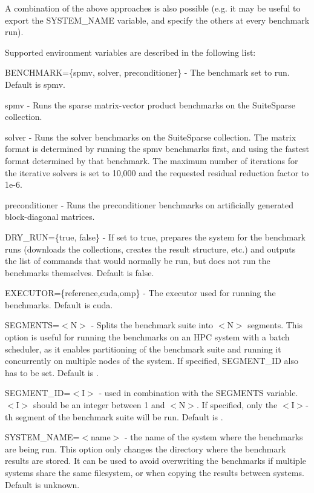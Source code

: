 A combination of the above approaches is also possible (e.\+g. it may be useful to {\ttfamily export} the {\ttfamily S\+Y\+S\+T\+E\+M\+\_\+\+N\+A\+ME} variable, and specify the others at every benchmark run).

Supported environment variables are described in the following list\+:


\begin{DoxyItemize}
\item {\ttfamily B\+E\+N\+C\+H\+M\+A\+RK=\{spmv, solver, preconditioner\}} -\/ The benchmark set to run. Default is {\ttfamily spmv}.
\begin{DoxyItemize}
\item {\ttfamily spmv} -\/ Runs the sparse matrix-\/vector product benchmarks on the Suite\+Sparse collection.
\item {\ttfamily solver} -\/ Runs the solver benchmarks on the Suite\+Sparse collection. The matrix format is determined by running the {\ttfamily spmv} benchmarks first, and using the fastest format determined by that benchmark. The maximum number of iterations for the iterative solvers is set to 10,000 and the requested residual reduction factor to 1e-\/6.
\item {\ttfamily preconditioner} -\/ Runs the preconditioner benchmarks on artificially generated block-\/diagonal matrices.
\end{DoxyItemize}
\item {\ttfamily D\+R\+Y\+\_\+\+R\+UN=\{true, false\}} -\/ If set to {\ttfamily true}, prepares the system for the benchmark runs (downloads the collections, creates the result structure, etc.) and outputs the list of commands that would normally be run, but does not run the benchmarks themselves. Default is {\ttfamily false}.
\item {\ttfamily E\+X\+E\+C\+U\+T\+OR=\{reference,cuda,omp\}} -\/ The executor used for running the benchmarks. Default is {\ttfamily cuda}.
\item {\ttfamily S\+E\+G\+M\+E\+N\+TS=$<$N$>$} -\/ Splits the benchmark suite into {\ttfamily $<$N$>$} segments. This option is useful for running the benchmarks on an H\+PC system with a batch scheduler, as it enables partitioning of the benchmark suite and running it concurrently on multiple nodes of the system. If specified, {\ttfamily S\+E\+G\+M\+E\+N\+T\+\_\+\+ID} also has to be set. Default is {}.
\item {\ttfamily S\+E\+G\+M\+E\+N\+T\+\_\+\+ID=$<$I$>$} -\/ used in combination with the {\ttfamily S\+E\+G\+M\+E\+N\+TS} variable. {\ttfamily $<$I$>$} should be an integer between 1 and {\ttfamily $<$N$>$}. If specified, only the {\ttfamily $<$I$>$}-\/th segment of the benchmark suite will be run. Default is {}.
\item {\ttfamily S\+Y\+S\+T\+E\+M\+\_\+\+N\+A\+ME=$<$name$>$} -\/ the name of the system where the benchmarks are being run. This option only changes the directory where the benchmark results are stored. It can be used to avoid overwriting the benchmarks if multiple systems share the same filesystem, or when copying the results between systems. Default is {\ttfamily unknown}.
\end{DoxyItemize}

